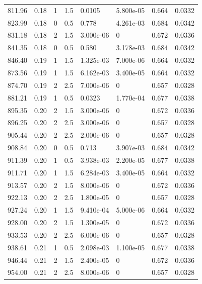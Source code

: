 \documentclass[preview]{standalone}
\begin{document}
{{{\begin{tabular}{L{1.2cm}C{1.2cm} C{0.3cm}C{0.5cm} C{1.4cm}C{1.4cm} C{1.4cm}C{1.4cm}}
  811.96  &  0.18  & 1     & 1.5 &  0.0105  & 5.800e-05  & 0.664 &  0.0332   \\ 
  823.99  &  0.18  & 0     & 0.5 &  0.778  & 4.261e-03  & 0.684 &  0.0342   \\ 
  831.18  &  0.18  & 2     & 1.5 &  3.000e-06  & 0  & 0.672 &  0.0336   \\ 
  841.35  &  0.18  & 0     & 0.5 &  0.580  & 3.178e-03  & 0.684 &  0.0342   \\ 
  846.40  &  0.19  & 1     & 1.5 &  1.325e-03  & 7.000e-06  & 0.664 &  0.0332   \\ 
  873.56  &  0.19  & 1     & 1.5 &  6.162e-03  & 3.400e-05  & 0.664 &  0.0332   \\ 
  874.70  &  0.19  & 2     & 2.5 &  7.000e-06  & 0  & 0.657 &  0.0328   \\ 
  881.21  &  0.19  & 1     & 0.5 &  0.0323  & 1.770e-04  & 0.677 &  0.0338   \\ 
  895.35  &  0.20  & 2     & 1.5 &  3.000e-06  & 0  & 0.672 &  0.0336   \\ 
  896.25  &  0.20  & 2     & 2.5 &  3.000e-06  & 0  & 0.657 &  0.0328   \\ 
  905.44  &  0.20  & 2     & 2.5 &  2.000e-06  & 0  & 0.657 &  0.0328   \\ 
  908.84  &  0.20  & 0     & 0.5 &  0.713  & 3.907e-03  & 0.684 &  0.0342   \\ 
  911.39  &  0.20  & 1     & 0.5 &  3.938e-03  & 2.200e-05  & 0.677 &  0.0338   \\ 
  911.71  &  0.20  & 1     & 1.5 &  6.284e-03  & 3.400e-05  & 0.664 &  0.0332   \\ 
  913.57  &  0.20  & 2     & 1.5 &  8.000e-06  & 0  & 0.672 &  0.0336   \\ 
  922.13  &  0.20  & 2     & 2.5 &  1.800e-05  & 0  & 0.657 &  0.0328   \\ 
  927.24  &  0.20  & 1     & 1.5 &  9.410e-04  & 5.000e-06  & 0.664 &  0.0332   \\ 
  928.00  &  0.20  & 2     & 1.5 &  1.300e-05  & 0  & 0.672 &  0.0336   \\ 
  933.53  &  0.20  & 2     & 2.5 &  6.000e-06  & 0  & 0.657 &  0.0328   \\ 
  938.61  &  0.21  & 1     & 0.5 &  2.098e-03  & 1.100e-05  & 0.677 &  0.0338   \\ 
  946.44  &  0.21  & 2     & 1.5 &  2.400e-05  & 0  & 0.672 &  0.0336   \\ 
  954.00  &  0.21  & 2     & 2.5 &  8.000e-06  & 0  & 0.657 &  0.0328   \\ 

\end{tabular}}}}
\end{document}
